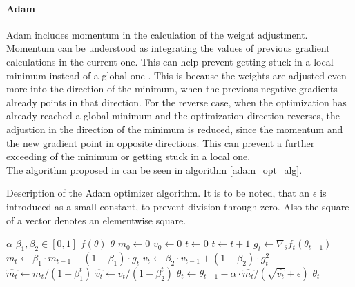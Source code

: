 \paragraph{Adam} Adam includes momentum in the calculation of the weight adjustment.
Momentum can be understood as integrating the values of previous gradient calculations in the current one.
This can help prevent getting stuck in a local minimum instead of a global one \cite{Kingma2014}.
This is because the weights are adjusted even more into the direction of the minimum, when the previous negative gradients already points in that direction.
For the reverse case, when the optimization has already reached a global minimum and the optimization direction reverses, the adjustion in the direction of the minimum is reduced, since the momentum and the new gradient point in opposite directions.
This can prevent a further exceeding of the minimum or getting stuck in a local one.\\
The algorithm proposed in \cite{Kingma2014} can be seen in algorithm \ref{adam_opt_alg}.
\begin{algorithm}
    \caption{Description of the Adam optimizer algorithm.
    It is to be noted, that an $\epsilon$ is introduced as a small constant, to prevent division through zero.
    Also the square of a vector denotes an elementwise square.}\label{adam_opt_alg}
\begin{algorithmic}[1]
    \Require $\alpha$ 
    \Require $\beta_1, \beta_2 \in [0,1]$ 
    \Require $f(\theta)$ 
    \Require $\theta$ 
    \State $m_0 \gets 0$
    \State $v_0 \gets 0$
    \State $t \gets 0$
        \State $t \gets t + 1$ 
        \State $g_t \gets \nabla_\theta f_t(\theta_{t-1})$ 
        \State $m_t \gets \beta_1 \cdot m_{t-1} + (1 - \beta_1) \cdot g_t$ 
        \State $v_t \gets \beta_2 \cdot v_{t-1} + (1 - \beta_2) \cdot g_t^2$ 
        \State $\hat{m_t} \gets m_t / (1 - \beta_1^t)$ 
        \State $\hat{v_t} \gets v_t / (1 - \beta_2^t)$ 
        \State $\theta_t \gets \theta_{t-1} - \alpha \cdot \hat{m_t} / (\sqrt{\hat{v_t}} + \epsilon)$ 
    \EndWhile
    \Return $\theta_t$
\end{algorithmic}
\end{algorithm}
